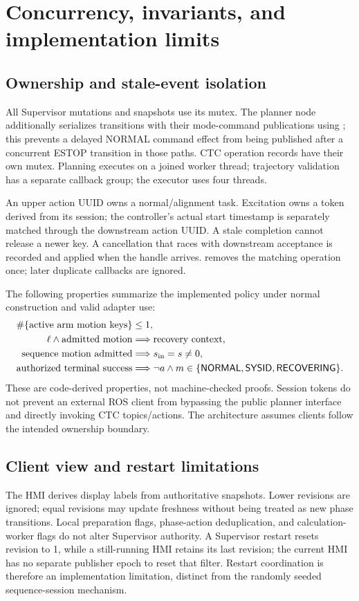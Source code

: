\documentclass[11pt,a4paper]{report}
\newcommand{\id}[1]{\texttt{\small\detokenize{#1}}}
\newcommand{\N}{\mathsf{NORMAL}}
\newcommand{\Y}{\mathsf{SYSID}}
\newcommand{\Rec}{\mathsf{RECOVERING}}
\begin{document}
\section{Concurrency, invariants, and implementation limits}
\subsection{Ownership and stale-event isolation}
All Supervisor mutations and snapshots use its mutex. The planner node additionally serializes transitions with their mode-command publications using \id{transition_mutex_}; this prevents a delayed NORMAL command effect from being published after a concurrent ESTOP transition in those paths. CTC operation records have their own mutex. Planning executes on a joined worker thread; trajectory validation has a separate callback group; the executor uses four threads.

An upper action UUID owns a normal/alignment task. Excitation owns a token derived from its session; the controller's actual start timestamp is separately matched through the downstream action UUID. A stale completion cannot release a newer key. A cancellation that races with downstream acceptance is recorded and applied when the handle arrives. \id{finish_ctc()} removes the matching operation once; later duplicate callbacks are ignored.

The following properties summarize the implemented policy under normal construction and valid adapter use:
\begin{align}
 \#\{\text{active arm motion keys}\}&\le1,\\
 \ell\land\text{admitted motion}&\Longrightarrow\text{recovery context},\\
 \text{sequence motion admitted}&\Longrightarrow s_{\rm in}=s\ne0,\\
 \text{authorized terminal success}&\Longrightarrow\neg a\land m\in\{\N,\Y,\Rec\}.
\end{align}
These are code-derived properties, not machine-checked proofs. Session tokens do not prevent an external ROS client from bypassing the public planner interface and directly invoking CTC topics/actions. The architecture assumes clients follow the intended ownership boundary.

\subsection{Client view and restart limitations}
The HMI derives display labels from authoritative snapshots. Lower revisions are ignored; equal revisions may update freshness without being treated as new phase transitions. Local preparation flags, phase-action deduplication, and calculation-worker flags do not alter Supervisor authority. A Supervisor restart resets revision to 1, while a still-running HMI retains its last revision; the current HMI has no separate publisher epoch to reset that filter. Restart coordination is therefore an implementation limitation, distinct from the randomly seeded sequence-session mechanism.
\end{document}
